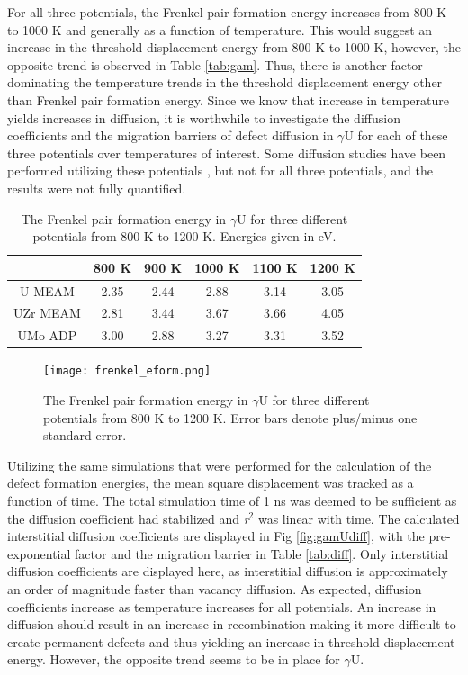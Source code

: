 \documentclass[review]{elsarticle}
\begin{document}
For all three potentials, the Frenkel pair formation energy increases from 800 K to 1000 K and generally as a function of temperature. This would suggest an increase in the threshold displacement energy from 800 K to 1000 K, however, the opposite trend is observed in Table \ref{tab:gam}. Thus, there is another factor dominating the temperature trends in the threshold displacement energy other than Frenkel pair formation energy. Since we know that increase in temperature yields increases in diffusion, it is worthwhile to investigate the diffusion coefficients and the migration barriers of defect diffusion in $\gamma$U for each of these three potentials over temperatures of interest. Some diffusion studies have been performed utilizing these potentials \cite{smirnovaADP}, but not for all three potentials, and the results were not fully quantified. 

\begin{table}[h]
\caption{The Frenkel pair formation energy in $\gamma$U for three different potentials from 800 K to 1200 K. Energies given in eV.} \label{tab:eform}
\begin{center}
\begin{tabular}{|c|c|c|c|c|c|}
	\hline
	& 800 K & 900 K & 1000 K & 1100 K & 1200 K\\
	 \hline
	 U MEAM & 2.35 & 2.44 & 2.88 & 3.14 & 3.05 \\
	 UZr MEAM & 2.81 & 3.44 & 3.67 & 3.66 & 4.05 \\
	 UMo ADP & 3.00 & 2.88 & 3.27 & 3.31 & 3.52 \\
	 \hline
\end{tabular}
\end{center}
\label{default}
\end{table}

\begin{figure}[h]
 \centering
 \texttt{[image: frenkel\_eform.png]} %
 \caption{The Frenkel pair formation energy in $\gamma$U for three different potentials from 800 K to 1200 K. Error bars denote plus/minus one standard error.}
 \label{fig:eform}
\end{figure}

\FloatBarrier

Utilizing the same simulations that were performed for the calculation of the defect formation energies, the mean square displacement was tracked as a function of time. The total simulation time of 1 ns was deemed to be sufficient as the diffusion coefficient had stabilized and \textit{r}$^{2}$ was linear with time. The calculated interstitial diffusion coefficients are displayed in Fig \ref{fig:gamUdiff}, with the pre-exponential factor and the migration barrier in Table \ref{tab:diff}. Only interstitial diffusion coefficients are displayed here, as interstitial diffusion is approximately an order of magnitude faster than vacancy diffusion. As expected, diffusion coefficients increase as temperature increases for all potentials. An increase in diffusion should result in an increase in recombination making it more difficult to create permanent defects and thus yielding an increase in threshold displacement energy. However, the opposite trend seems to be in place for $\gamma$U. 
\end{document}
